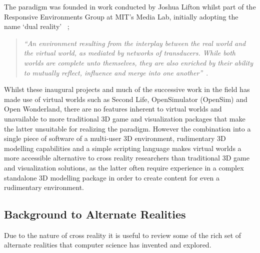 \documentclass{sig-alternate}
\begin{document}
The paradigm was founded in work conducted by Joshua Lifton whilst part of the Responsive Environments Group at MIT's Media Lab, initially adopting the name `dual reality' ~\cite{Lifton2009, lifton:adoption};

\begin{quotation}
	\textit{``An environment resulting from the interplay between the real world and the virtual world, as mediated by networks of transducers. While both worlds are complete unto themselves, they are also enriched by their ability to mutually reflect, influence and merge into one another''}~\cite{Lifton2007a, lifton:merging}.
\end{quotation}

Whilst these inaugural projects and much of the successive work in the field has made use of virtual worlds such as Second Life, OpenSimulator (OpenSim) and Open Wonderland, there are no features inherent to virtual worlds and unavailable to more traditional 3D game and visualization packages that make the latter unsuitable for realizing the paradigm. However the combination into a single piece of software of a multi-user 3D environment, rudimentary 3D modelling capabilities and a simple scripting language makes virtual worlds a more accessible alternative to cross reality researchers than traditional 3D game and visualization solutions, as the latter often require experience in a complex standalone 3D modelling package in order to create content for even a rudimentary environment.

\subsection{Background to Alternate Realities}
Due to the nature of cross reality it is useful to review some of the rich set of alternate realities that computer science has invented and explored.
\end{document}

